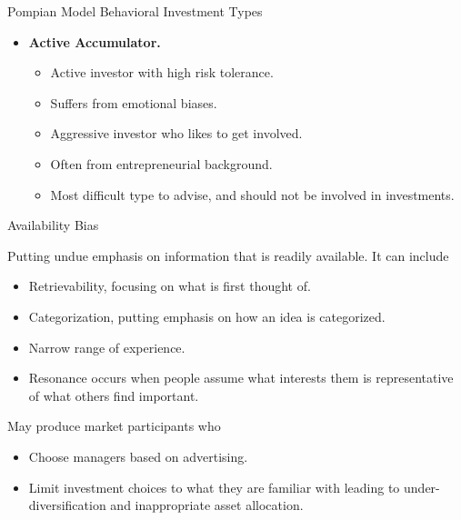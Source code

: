 \documentclass[../custom]{flashcards}
\begin{document}
\begin{flashcard}[\studyArea]{Pompian Model Behavioral Investment Types}
\begin{itemize}[nosep]
        \item \textbf{Active Accumulator.}
            \begin{itemize}[nosep]
                \item Active investor with high risk tolerance.
                \item Suffers from emotional biases. 
                \item Aggressive investor who likes to get involved.
                \item Often from entrepreneurial background.
                \item Most difficult type to advise, and should not be involved in investments.
            \end{itemize}
    \end{itemize}
\end{flashcard}

\begin{flashcard}[\studyArea]{Availability Bias}
    \begin{flushleft}
        Putting undue emphasis on information that is readily available. It can include
        \begin{itemize}
            \item Retrievability, focusing on what is first thought of.
            \item Categorization, putting emphasis on how an idea is categorized.
            \item Narrow range of experience.
            \item Resonance occurs when people assume what interests them is representative of what others find important.\newline
        \end{itemize}

        May produce market participants who
        \begin{itemize}
            \item Choose managers based on advertising.
            \item Limit investment choices to what they are familiar with leading to under-diversification and inappropriate asset allocation.
        \end{itemize}
    \end{flushleft}
\end{flashcard}

\renewcommand{\studyArea}{Portfolio Management for Institutional Investors}
\end{document}
